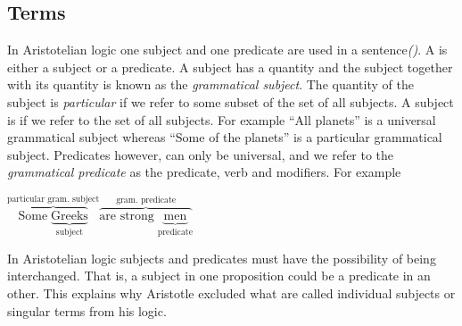 \documentclass[12pt]{article}
\begin{document}
\subsection*{Terms}
In Aristotelian logic one subject and one predicate are used in a sentence\textit{()}.  A \emph{} is either a subject or a predicate.  A subject has a quantity and the subject together with its quantity is known as the \emph{grammatical subject}.  The quantity of the subject is \emph{particular} if we refer to some subset of the set of all subjects.  A subject is \emph{} if we refer to the set of all subjects.  For example ``All planets'' is a universal grammatical subject whereas ``Some of the planets'' is a particular grammatical subject.  Predicates however, can only be universal, and we refer to the \emph{grammatical predicate} as the predicate, verb and modifiers.  For example
\begin{center}
$\overbrace{\text{Some}\;\underbrace{\text{Greeks}}_{\text{subject}}}^{\text{particular gram. subject}} \overbrace{\text{are strong}\; \underbrace{\text{men}}_{\text{predicate}}}^{\text{gram. predicate}}$
\end{center}

In Aristotelian logic subjects and predicates must have the possibility of being interchanged.  That is, a subject in one proposition could be a predicate in an other.  This explains why Aristotle excluded what are called individual subjects or singular terms from his logic.
\end{document}
